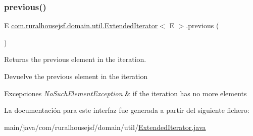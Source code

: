 \subsubsection{\texorpdfstring{previous()}{previous()}}
{\footnotesize\ttfamily E \mbox{\hyperlink{interfacecom_1_1ruralhousejsf_1_1domain_1_1util_1_1_extended_iterator}{com.\+ruralhousejsf.\+domain.\+util.\+Extended\+Iterator}}$<$ E $>$.previous (\begin{DoxyParamCaption}{ }\end{DoxyParamCaption})}



Returns the previous element in the iteration. 

\begin{DoxyReturn}{Devuelve}
the previous element in the iteration 
\end{DoxyReturn}

\begin{DoxyExceptions}{Excepciones}
{\em No\+Such\+Element\+Exception} & if the iteration has no more elements \\
\hline
\end{DoxyExceptions}


La documentación para este interfaz fue generada a partir del siguiente fichero\+:\begin{DoxyCompactItemize}
\item 
main/java/com/ruralhousejsf/domain/util/\mbox{\hyperlink{_extended_iterator_8java}{Extended\+Iterator.\+java}}\end{DoxyCompactItemize}
